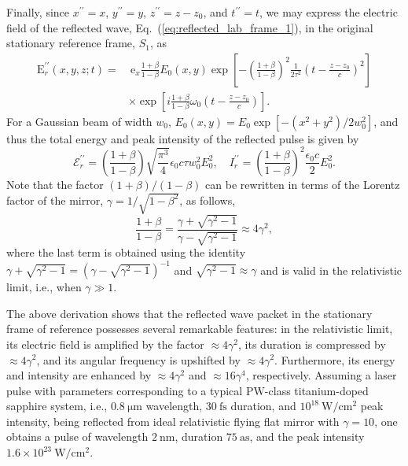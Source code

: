 \documentclass[10pt, a4paper, twoside, openright]{report}
\renewcommand{\vec}[1]{\boldsymbol{\mathrm{#1}}}
\begin{document}
Finally, since $ x^{\prime \prime} = x $, $ y^{\prime \prime} = y $, $ z^{\prime \prime} = z - z_0 $, and $ t^{\prime \prime} = t $,
we may express the electric field of the reflected wave, Eq.~(\ref{eq:reflected_lab_frame_1}), in the original stationary reference frame, $ S_1 $, as
\begin{equation}\label{eq:reflected_lab_frame_2}
\begin{split}
\vec{E}^{\prime \prime}_r \left(x, y, z; t \right) = & \ \vec{e}_x \frac{1 + \beta}{1 - \beta} E_0 \left(x, y \right) \exp \left[ - \left(\frac{1 + \beta}{1 - \beta}\right)^2 \frac{1}{2 \tau^2} \left(t - \frac{z - z_0}{c}\right)^2 \right] \\ 
& \times \exp \left[ i \frac{1 + \beta}{1 - \beta} \omega_0 \left(t - \frac{z - z_0}{c}\right) \right].
\end{split}
\end{equation}
For a Gaussian beam of width $ w_0 $, $ E_0 \left( x, y \right) = E_0 \exp \left[-\left( x^2 + y^2 \right) / 2 w_0^2 \right] $, and thus the total energy and peak intensity of the reflected pulse is given by 
\begin{equation}\label{eq:energy_and_intensity}
\mathcal{E}^{\prime \prime}_r = \left(\frac{1 + \beta}{1 - \beta}\right) \sqrt{\frac{\pi^3}{4}} \epsilon_0 c \tau w_0^2 E_0^2 , \quad I^{\prime \prime}_r = \left(\frac{1 + \beta}{1 - \beta}\right)^2 \frac{\epsilon_0 c}{2} E_0^2.
\end{equation}
Note that the factor $ \left(1 + \beta \right) / \left(1 - \beta \right) $ can be rewritten in terms of the Lorentz factor of the mirror, $ \gamma = 1 / \sqrt{1 - \beta^2} $, as follows,
\begin{equation}\label{eq:factor}
\frac{1 + \beta}{1 - \beta} = \frac{\gamma + \sqrt{\gamma^2 - 1}}{\gamma - \sqrt{\gamma^2 - 1}} \approx 4 \gamma^2,
\end{equation}
where the last term is obtained using the identity $ \gamma + \sqrt{\gamma^2 - 1} = ( \gamma - \sqrt{\gamma^2 - 1} )^{-1} $ and $ \sqrt{\gamma^2 - 1} \approx \gamma $ and is valid in the relativistic limit, i.e., when $ \gamma \gg 1 $.

The above derivation shows that the reflected wave packet in the stationary frame of reference possesses several remarkable features: in the relativistic limit, its electric field is amplified by the factor $ \approx 4 \gamma^2 $, its duration is compressed by $ \approx 4 \gamma^2 $, and its angular frequency is upshifted by $ \approx 4 \gamma^2 $. Furthermore, its energy and intensity are enhanced by $ \approx 4 \gamma^2 $ and $ \approx 16 \gamma^4 $, respectively. Assuming a laser pulse with parameters corresponding to a typical $ \mathrm{PW} $-class titanium-doped sapphire system, i.e., $ 0.8 \ \mathrm{\mu m} $ wavelength, $ 30 \ \mathrm{fs} $ duration, and $ 10^{18} \ \mathrm{W / cm^2} $ peak intensity, being reflected from ideal relativistic flying flat mirror with $ \gamma = 10 $, one obtains a pulse of wavelength $ 2 \ \mathrm{nm} $, duration $ 75 \ \mathrm{as} $, and the peak intensity $ 1.6 \times 10^{23} \ \mathrm{W / cm^2} $.
\end{document}
